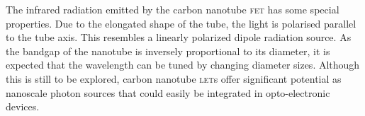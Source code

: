 The infrared radiation emitted by the carbon nanotube \textsc{fet} has some special properties. Due to the elongated shape of the tube, the light is polarised parallel to the tube axis. This resembles a linearly polarized dipole radiation source. As the bandgap of the nanotube is inversely proportional to its diameter, it is expected that the wavelength can be tuned by changing diameter sizes. Although this is still to be explored, carbon nanotube \textsc{let}s offer significant potential as nanoscale photon sources that could easily be integrated in opto-electronic devices.


